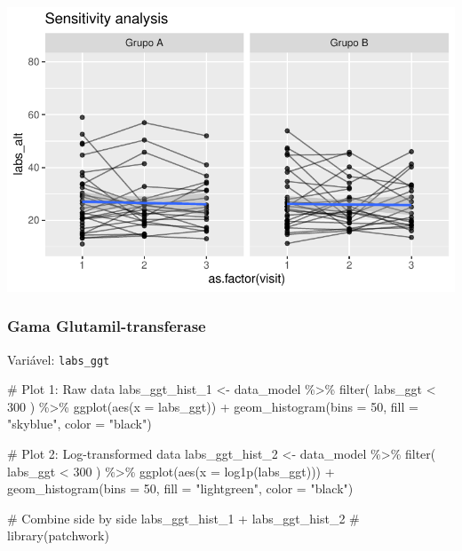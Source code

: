 \documentclass[
  12pt,
]{article}
\newenvironment{Shaded}{\begin{snugshade}}{\end{snugshade}}
\newcommand{\AttributeTok}[1]{\textcolor[rgb]{0.40,0.45,0.13}{#1}}
\newcommand{\CommentTok}[1]{\textcolor[rgb]{0.37,0.37,0.37}{#1}}
\newcommand{\DecValTok}[1]{\textcolor[rgb]{0.68,0.00,0.00}{#1}}
\newcommand{\FunctionTok}[1]{\textcolor[rgb]{0.28,0.35,0.67}{#1}}
\newcommand{\NormalTok}[1]{\textcolor[rgb]{0.00,0.23,0.31}{#1}}
\newcommand{\OtherTok}[1]{\textcolor[rgb]{0.00,0.23,0.31}{#1}}
\newcommand{\SpecialCharTok}[1]{\textcolor[rgb]{0.37,0.37,0.37}{#1}}
\newcommand{\StringTok}[1]{\textcolor[rgb]{0.13,0.47,0.30}{#1}}
\begin{document}
\includegraphics{Outcomes_files/figure-pdf/labs_alt_6-2.pdf}

\subsubsection{Gama
Glutamil-transferase}\label{gama-glutamil-transferase}

Variável: \texttt{labs\_ggt}

\begin{Shaded}
\begin{Highlighting}[]
\CommentTok{\# Plot 1: Raw data}
\NormalTok{labs\_ggt\_hist\_1 }\OtherTok{\textless{}{-}}\NormalTok{ data\_model }\SpecialCharTok{\%\textgreater{}\%} 
    \FunctionTok{filter}\NormalTok{(}
\NormalTok{        labs\_ggt }\SpecialCharTok{\textless{}} \DecValTok{300}
\NormalTok{    ) }\SpecialCharTok{\%\textgreater{}\%} 
    \FunctionTok{ggplot}\NormalTok{(}\FunctionTok{aes}\NormalTok{(}\AttributeTok{x =}\NormalTok{ labs\_ggt)) }\SpecialCharTok{+} 
    \FunctionTok{geom\_histogram}\NormalTok{(}\AttributeTok{bins =} \DecValTok{50}\NormalTok{, }\AttributeTok{fill =} \StringTok{"skyblue"}\NormalTok{, }\AttributeTok{color =} \StringTok{"black"}\NormalTok{)}

\CommentTok{\# Plot 2: Log{-}transformed data}
\NormalTok{labs\_ggt\_hist\_2 }\OtherTok{\textless{}{-}}\NormalTok{ data\_model }\SpecialCharTok{\%\textgreater{}\%} 
    \FunctionTok{filter}\NormalTok{(}
\NormalTok{        labs\_ggt }\SpecialCharTok{\textless{}} \DecValTok{300}
\NormalTok{    ) }\SpecialCharTok{\%\textgreater{}\%}
    \FunctionTok{ggplot}\NormalTok{(}\FunctionTok{aes}\NormalTok{(}\AttributeTok{x =} \FunctionTok{log1p}\NormalTok{(labs\_ggt))) }\SpecialCharTok{+} 
    \FunctionTok{geom\_histogram}\NormalTok{(}\AttributeTok{bins =} \DecValTok{50}\NormalTok{, }\AttributeTok{fill =} \StringTok{"lightgreen"}\NormalTok{, }\AttributeTok{color =} \StringTok{"black"}\NormalTok{)}

\CommentTok{\# Combine side by side}
\NormalTok{labs\_ggt\_hist\_1 }\SpecialCharTok{+}\NormalTok{ labs\_ggt\_hist\_2 }\CommentTok{\# library(patchwork)}
\end{Highlighting}
\end{Shaded}
\end{document}
